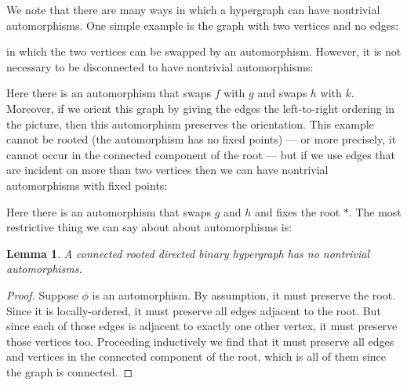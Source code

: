 \documentclass{article}
\newtheorem{lem}[thm]{Lemma}
\theoremstyle{definition}
\theoremstyle{remark}
\begin{document}
We note that there are many ways in which a hypergraph can have nontrivial automorphisms.
One simple example is the graph with two vertices and no edges:
\begin{center}
\end{center}
in which the two vertices can be swapped by an automorphism.
However, it is not necessary to be disconnected to have nontrivial automorphisms:
\begin{center}
\end{center}
Here there is an automorphism that swaps $f$ with $g$ and swaps $h$ with $k$.
Moreover, if we orient this graph by giving the edges the left-to-right ordering in the picture, then this automorphism preserves the orientation.
This example cannot be rooted (the automorphism has no fixed points) --- or more precisely, it cannot occur in the connected component of the root --- but if we use edges that are incident on more than two vertices then we can have nontrivial automorphisms with fixed points:
\begin{center}
\end{center}
Here there is an automorphism that swaps $g$ and $h$ and fixes the root $\ast$.
The most restrictive thing we can say about about automorphisms is:

\begin{lem}
  A connected rooted directed binary hypergraph has no nontrivial automorphisms.
\end{lem}
\begin{proof}
  Suppose $\phi$ is an automorphism.
  By assumption, it must preserve the root.
  Since it is locally-ordered, it must preserve all edges adjacent to the root.
  But since each of those edges is adjacent to exactly one other vertex, it must preserve those vertices too.
  Proceeding inductively we find that it must preserve all edges and vertices in the connected component of the root, which is all of them since the graph is connected.
\end{proof}
\end{document}

